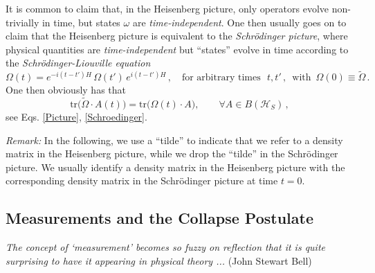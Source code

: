 \documentclass[12pt]{article}
\begin{document}
It is common to claim that, in the Heisenberg picture, only operators evolve non-trivially in time, but states $\omega$ are \textit{time-independent}. One then usually goes on to claim that the Heisenberg picture is equivalent to the \textit{Schr\"odinger picture}, where physical quantities are \textit{time-independent} but ``states'' evolve in time according to the \textit{Schr\"odinger-Liouville equation}
\begin{equation}\label{Schroedinger}
\Omega(t)= e^{-i(t-t')H} \,\Omega(t') \, e^{i(t-t')H}\,, \quad \text{for arbitrary times }\,\, t, t'\,, \, \text{ with }\, \Omega(0)\equiv \widetilde{\Omega}\,.
\end{equation}
One then obviously has that
$$\text{tr}\big(\widetilde{\Omega}\cdot A(t)\big)= \text{tr}\big(\Omega(t)\cdot A\big), \qquad \forall A \in B(\mathcal{H}_S)\,,$$
see Eqs. \eqref{Picture}, \eqref{Schroedinger}.

\textit{Remark:} In the following, we use a ``tilde'' to indicate that we refer to a density matrix in the Heisenberg picture, while we drop the ``tilde'' in the Schr\"odinger picture. We usually identify a density matrix in the Heisenberg picture with the corresponding density matrix in the Schr\"odinger picture at time $t=0$.

\subsection{Measurements and the Collapse Postulate}

\hspace{0.5cm}\textit{The concept of `measurement' becomes so fuzzy on reflection that it is quite surprising to have it appearing in physical theory ...} (John Stewart Bell)
\end{document}
